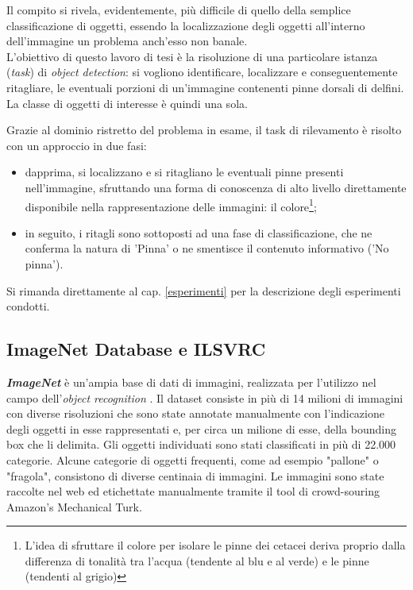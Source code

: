 Il compito si rivela, evidentemente, più difficile di quello della semplice classificazione di oggetti, essendo la localizzazione degli oggetti all'interno dell'immagine un problema anch'esso non banale.\\

L'obiettivo di questo lavoro di tesi è la risoluzione di una particolare istanza (\textit{task}) di \textit{object detection}: si vogliono identificare, localizzare e conseguentemente ritagliare, le eventuali porzioni di un'immagine contenenti pinne dorsali di delfini. La classe di oggetti di interesse è quindi una sola.

Grazie al dominio ristretto del problema in esame, il task di rilevamento è risolto con un approccio in due fasi:
\begin{itemize}
\item dapprima, si localizzano e si ritagliano le eventuali pinne presenti nell'immagine, sfruttando una forma di conoscenza di alto livello direttamente disponibile nella rappresentazione delle immagini: il colore\footnote{L'idea di sfruttare il colore per isolare le pinne dei cetacei deriva proprio dalla differenza di tonalità tra l'acqua (tendente al blu e al verde) e le pinne (tendenti al grigio)};
\item in seguito, i ritagli sono sottoposti ad una fase di classificazione, che ne conferma la natura di 'Pinna' o ne smentisce il contenuto informativo ('No pinna').
\end{itemize}
Si rimanda direttamente al cap. \ref{esperimenti} per la descrizione degli esperimenti condotti.

\subsection{ImageNet Database e ILSVRC}
\label{imagenet}
\textbf{\textit{ImageNet}} è un'ampia base di dati di immagini, realizzata per l'utilizzo nel campo dell'\textit{object recognition} \cite{imagenet}. Il dataset consiste in più di 14 milioni di immagini con diverse risoluzioni che sono state annotate manualmente con l'indicazione degli oggetti in esse rappresentati e, per circa un milione di esse, della bounding box che li delimita. Gli oggetti individuati sono stati classificati in più di 22.000 categorie. Alcune categorie di oggetti frequenti, come ad esempio "pallone" o "fragola", consistono di diverse centinaia di immagini.
Le immagini sono state raccolte nel web ed etichettate manualmente tramite il tool di crowd-souring Amazon’s Mechanical Turk.\\

